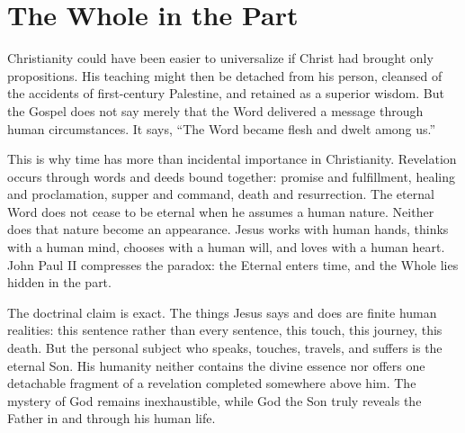 \section{The Whole in the Part}

Christianity could have been easier to universalize if Christ had brought only propositions. His teaching might then be detached from his person, cleansed of the accidents of first-century Palestine, and retained as a superior wisdom. But the Gospel does not say merely that the Word delivered a message through human circumstances. It says, ``The Word became flesh and dwelt among us.''

This is why time has more than incidental importance in Christianity. Revelation occurs through words and deeds bound together: promise and fulfillment, healing and proclamation, supper and command, death and resurrection. The eternal Word does not cease to be eternal when he assumes a human nature. Neither does that nature become an appearance. Jesus works with human hands, thinks with a human mind, chooses with a human will, and loves with a human heart. John Paul II compresses the paradox: the Eternal enters time, and the Whole lies hidden in the part.

The doctrinal claim is exact. The things Jesus says and does are finite human realities: this sentence rather than every sentence, this touch, this journey, this death. But the personal subject who speaks, touches, travels, and suffers is the eternal Son. His humanity neither contains the divine essence nor offers one detachable fragment of a revelation completed somewhere above him. The mystery of God remains inexhaustible, while God the Son truly reveals the Father in and through his human life.


